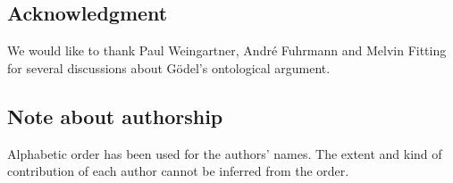 \documentclass{birkmult}
\theoremstyle{definition}
\theoremstyle{remark}
\numberwithin{equation}{section}
\begin{document}
\subsection*{Acknowledgment}

We would like to thank Paul Weingartner, Andr\'{e} Fuhrmann 
and Melvin Fitting for several discussions about 
G\"odel's ontological argument.


\subsection*{Note about authorship}

Alphabetic order has been used for the authors' names. 
The extent and kind of contribution of each author 
cannot be inferred from the order.




\clearpage
\end{document}
